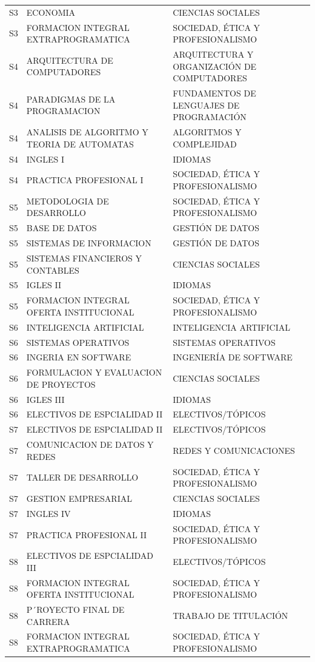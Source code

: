 \documentclass[11pt,a4paper]{article}
\begin{document}
\begin{small}
\begin{longtable}{c >{\raggedright\arraybackslash}p{8.5cm} >{\raggedright\arraybackslash}p{5.5cm}}
S3 & ECONOMIA & CIENCIAS SOCIALES \\
S3 & FORMACION INTEGRAL EXTRAPROGRAMATICA & SOCIEDAD, ÉTICA Y PROFESIONALISMO \\
S4 & ARQUITECTURA DE COMPUTADORES & ARQUITECTURA Y ORGANIZACIÓN DE COMPUTADORES \\
S4 & PARADIGMAS DE LA PROGRAMACION & FUNDAMENTOS DE LENGUAJES DE PROGRAMACIÓN \\
S4 & ANALISIS DE ALGORITMO Y TEORIA DE AUTOMATAS & ALGORITMOS Y COMPLEJIDAD \\
S4 & INGLES I & IDIOMAS \\
S4 & PRACTICA PROFESIONAL I & SOCIEDAD, ÉTICA Y PROFESIONALISMO \\
S5 & METODOLOGIA DE DESARROLLO & SOCIEDAD, ÉTICA Y PROFESIONALISMO \\
S5 & BASE DE DATOS & GESTIÓN DE DATOS \\
S5 & SISTEMAS DE INFORMACION & GESTIÓN DE DATOS \\
S5 & SISTEMAS FINANCIEROS Y CONTABLES & CIENCIAS SOCIALES \\
S5 & IGLES II & IDIOMAS \\
S5 & FORMACION INTEGRAL OFERTA INSTITUCIONAL & SOCIEDAD, ÉTICA Y PROFESIONALISMO \\
S6 & INTELIGENCIA ARTIFICIAL & INTELIGENCIA ARTIFICIAL \\
S6 & SISTEMAS OPERATIVOS & SISTEMAS OPERATIVOS \\
S6 & INGERIA EN SOFTWARE & INGENIERÍA DE SOFTWARE \\
S6 & FORMULACION Y EVALUACION DE PROYECTOS & CIENCIAS SOCIALES \\
S6 & IGLES III & IDIOMAS \\
S6 & ELECTIVOS DE ESPCIALIDAD II & ELECTIVOS/TÓPICOS \\
S7 & ELECTIVOS DE ESPCIALIDAD II & ELECTIVOS/TÓPICOS \\
S7 & COMUNICACION DE DATOS Y REDES & REDES Y COMUNICACIONES \\
S7 & TALLER DE DESARROLLO & SOCIEDAD, ÉTICA Y PROFESIONALISMO \\
S7 & GESTION EMPRESARIAL & CIENCIAS SOCIALES \\
S7 & INGLES IV & IDIOMAS \\
S7 & PRACTICA PROFESIONAL II & SOCIEDAD, ÉTICA Y PROFESIONALISMO \\
S8 & ELECTIVOS DE ESPCIALIDAD III & ELECTIVOS/TÓPICOS \\
S8 & FORMACION INTEGRAL OFERTA INSTITUCIONAL & SOCIEDAD, ÉTICA Y PROFESIONALISMO \\
S8 & P´ROYECTO FINAL DE CARRERA & TRABAJO DE TITULACIÓN \\
S8 & FORMACION INTEGRAL EXTRAPROGRAMATICA & SOCIEDAD, ÉTICA Y PROFESIONALISMO \\
\end{longtable}
\end{small}
\end{document}

